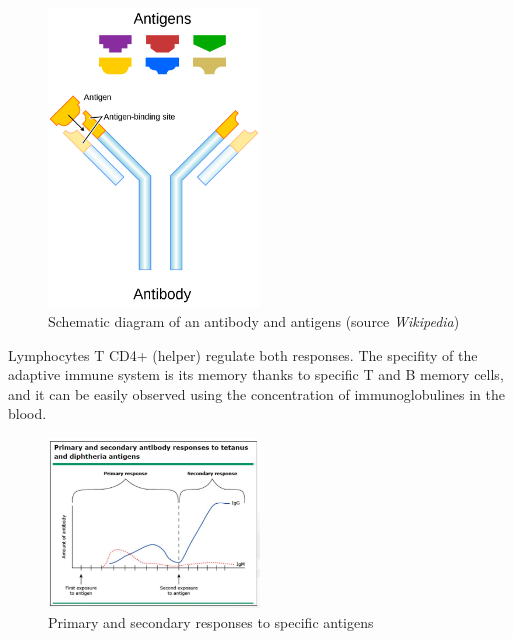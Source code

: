 \documentclass{article}
\begin{document}
\begin{itemize}
                        \begin{figure}
                            \centering
                            \includegraphics[width=0.5\textwidth]{imgs/Antigen.png}
                        \caption{Schematic diagram of an antibody and antigens (source \emph{Wikipedia})}
                            \label{fig:antigens}
                        \end{figure}

                        Lymphocytes T CD4+ (helper) regulate both responses.
                        The specifity of the adaptive immune system is its memory thanks to specific T and B memory cells, 
                            and it can be easily observed using the concentration of immunoglobulines in the blood.
                        
                            \begin{figure}
                                \centering
                                \includegraphics[width=0.5\textwidth]{imgs/PrimarySecondaryResponses.JPG}
                                \caption{Primary and secondary responses to specific antigens \autocite{pinkComparisonImmunityGeneral}}
                                \label{fig:responses}
                            \end{figure}


\end{itemize}
\end{document}
